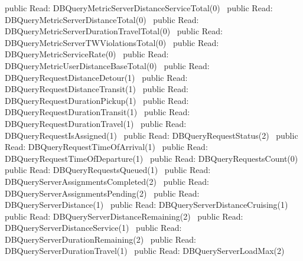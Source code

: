 public \LA{}Read: DBQueryMetricServerDistanceServiceTotal(0)~{\nwtagstyle{}}\RA{}
public \LA{}Read: DBQueryMetricServerDistanceTotal(0)~{\nwtagstyle{}}\RA{}
public \LA{}Read: DBQueryMetricServerDurationTravelTotal(0)~{\nwtagstyle{}}\RA{}
public \LA{}Read: DBQueryMetricServerTWViolationsTotal(0)~{\nwtagstyle{}}\RA{}
public \LA{}Read: DBQueryMetricServiceRate(0)~{\nwtagstyle{}}\RA{}
public \LA{}Read: DBQueryMetricUserDistanceBaseTotal(0)~{\nwtagstyle{}}\RA{}
public \LA{}Read: DBQueryRequestDistanceDetour(1)~{\nwtagstyle{}}\RA{}
public \LA{}Read: DBQueryRequestDistanceTransit(1)~{\nwtagstyle{}}\RA{}
public \LA{}Read: DBQueryRequestDurationPickup(1)~{\nwtagstyle{}}\RA{}
public \LA{}Read: DBQueryRequestDurationTransit(1)~{\nwtagstyle{}}\RA{}
public \LA{}Read: DBQueryRequestDurationTravel(1)~{\nwtagstyle{}}\RA{}
public \LA{}Read: DBQueryRequestIsAssigned(1)~{\nwtagstyle{}}\RA{}
public \LA{}Read: DBQueryRequestStatus(2)~{\nwtagstyle{}}\RA{}
public \LA{}Read: DBQueryRequestTimeOfArrival(1)~{\nwtagstyle{}}\RA{}
public \LA{}Read: DBQueryRequestTimeOfDeparture(1)~{\nwtagstyle{}}\RA{}
public \LA{}Read: DBQueryRequestsCount(0)~{\nwtagstyle{}}\RA{}
public \LA{}Read: DBQueryRequestsQueued(1)~{\nwtagstyle{}}\RA{}
public \LA{}Read: DBQueryServerAssignmentsCompleted(2)~{\nwtagstyle{}}\RA{}
public \LA{}Read: DBQueryServerAssignmentsPending(2)~{\nwtagstyle{}}\RA{}
public \LA{}Read: DBQueryServerDistance(1)~{\nwtagstyle{}}\RA{}
public \LA{}Read: DBQueryServerDistanceCruising(1)~{\nwtagstyle{}}\RA{}
public \LA{}Read: DBQueryServerDistanceRemaining(2)~{\nwtagstyle{}}\RA{}
public \LA{}Read: DBQueryServerDistanceService(1)~{\nwtagstyle{}}\RA{}
public \LA{}Read: DBQueryServerDurationRemaining(2)~{\nwtagstyle{}}\RA{}
public \LA{}Read: DBQueryServerDurationTravel(1)~{\nwtagstyle{}}\RA{}
public \LA{}Read: DBQueryServerLoadMax(2)~{\nwtagstyle{}}\RA{}

